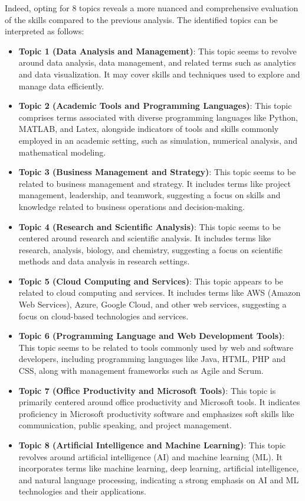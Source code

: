 \documentclass[11pt,]{article}
\providecommand{\tightlist}{%
\setlength{\itemsep}{0pt}\setlength{\parskip}{0pt}}
\begin{document}
Indeed, opting for 8 topics reveals a more nuanced and comprehensive
evaluation of the skills compared to the previous analysis. The
identified topics can be interpreted as follows:

\begin{itemize}
\tightlist
\item
  \textbf{Topic 1 (Data Analysis and Management)}: This topic seems to
  revolve around data analysis, data management, and related terms such
  as analytics and data visualization. It may cover skills and
  techniques used to explore and manage data efficiently.
\item
  \textbf{Topic 2 (Academic Tools and Programming Languages)}: This
  topic comprises terms associated with diverse programming languages
  like Python, MATLAB, and Latex, alongside indicators of tools and
  skills commonly employed in an academic setting, such as simulation,
  numerical analysis, and mathematical modeling.
\item
  \textbf{Topic 3 (Business Management and Strategy)}: This topic seems
  to be related to business management and strategy. It includes terms
  like project management, leadership, and teamwork, suggesting a focus
  on skills and knowledge related to business operations and
  decision-making.
\item
  \textbf{Topic 4 (Research and Scientific Analysis)}: This topic seems
  to be centered around research and scientific analysis. It includes
  terms like research, analysis, biology, and chemistry, suggesting a
  focus on scientific methods and data analysis in research settings.
\item
  \textbf{Topic 5 (Cloud Computing and Services)}: This topic appears to
  be related to cloud computing and services. It includes terms like AWS
  (Amazon Web Services), Azure, Google Cloud, and other web services,
  suggesting a focus on cloud-based technologies and services.
\item
  \textbf{Topic 6 (Programming Language and Web Development Tools)}:
  This topic seems to be related to tools commonly used by web and
  software developers, including programming languages like Java, HTML,
  PHP and CSS, along with management frameworks such as Agile and Scrum.
\item
  \textbf{Topic 7 (Office Productivity and Microsoft Tools)}: This topic
  is primarily centered around office productivity and Microsoft tools.
  It indicates proficiency in Microsoft productivity software and
  emphasizes soft skills like communication, public speaking, and
  project management.
\item
  \textbf{Topic 8 (Artificial Intelligence and Machine Learning)}: This
  topic revolves around artificial intelligence (AI) and machine
  learning (ML). It incorporates terms like machine learning, deep
  learning, artificial intelligence, and natural language processing,
  indicating a strong emphasis on AI and ML technologies and their
  applications.
\end{itemize}
\end{document}
